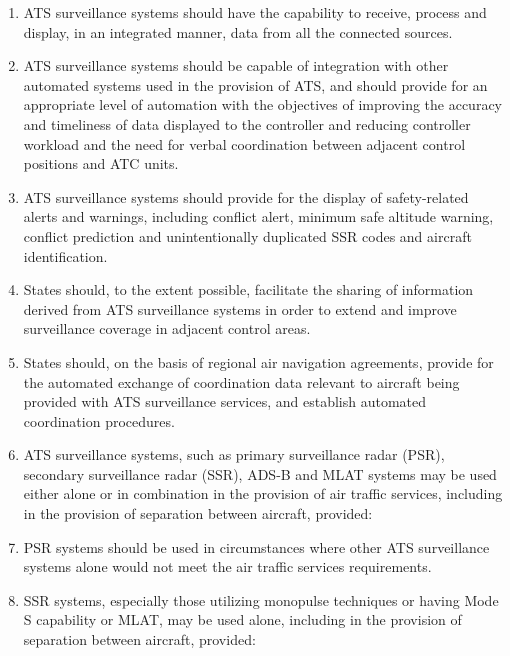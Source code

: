 \documentclass[../main.tex]{subfiles}
\begin{document}
\begin{enumerate}[label=\arabic{section}.\arabic{subsection}.\arabic*]
        \item ATS surveillance systems should have the capability to receive, process and display, in an integrated manner, data from all the connected sources.
        \item ATS surveillance systems should be capable of integration with other automated systems used in the provision of ATS, and should provide for an appropriate level of automation with the objectives of improving the accuracy and timeliness of data displayed to the controller and reducing controller workload and the need for verbal coordination between adjacent control positions and ATC units.
        \item ATS surveillance systems should provide for the display of safety-related alerts and warnings, including conflict alert, minimum safe altitude warning, conflict prediction and unintentionally duplicated SSR codes and aircraft identification.
        \item States should, to the extent possible, facilitate the sharing of information derived from ATS surveillance systems in order to extend and improve surveillance coverage in adjacent control areas.
        \item States should, on the basis of regional air navigation agreements, provide for the automated exchange of coordination data relevant to aircraft being provided with ATS surveillance services, and establish automated coordination procedures.
        \item ATS surveillance systems, such as primary surveillance radar (PSR), secondary surveillance radar (SSR), ADS-B and MLAT systems may be used either alone or in combination in the provision of air traffic services, including in the provision of separation between aircraft, provided:


        \item PSR systems should be used in circumstances where other ATS surveillance systems alone would not meet the air traffic services requirements.
        \item SSR systems, especially those utilizing monopulse techniques or having Mode S capability or MLAT, may be used alone, including in the provision of separation between aircraft, provided:


\end{enumerate}
\end{document}
